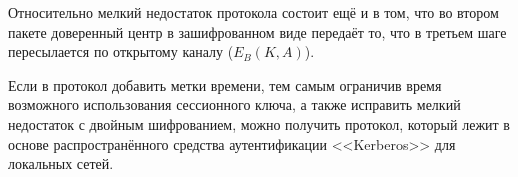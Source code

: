 Относительно мелкий недостаток протокола состоит ещё и в том, что во втором пакете доверенный центр в зашифрованном виде передаёт то, что в третьем шаге пересылается по открытому каналу ($E_B \left( K, A \right)$).

Если в протокол добавить метки времени, тем самым ограничив время возможного использования сессионного ключа, а также исправить мелкий недостаток с двойным шифрованием, можно получить протокол, который лежит в основе распространённого средства аутентификации <<Kerberos>> для локальных сетей.

